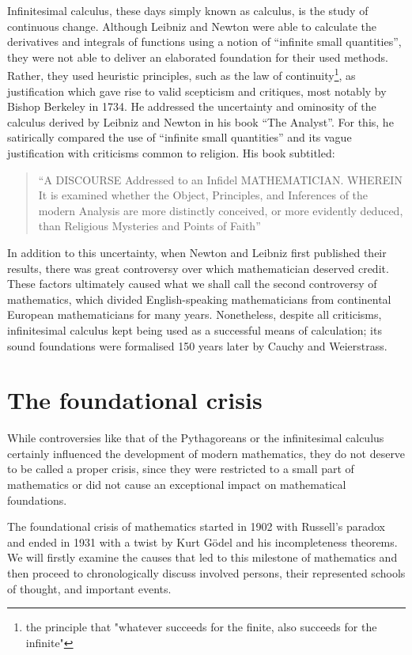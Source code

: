 \documentclass[hidelinks]{article}
\begin{document}
Infinitesimal calculus, these days simply known as calculus, is the study of continuous change. Although Leibniz and Newton were able to calculate the derivatives and integrals of functions using a notion of ``infinite small quantities'', they were not able to deliver an elaborated foundation for their used methods. Rather, they used heuristic principles, such as the law of continuity\footnote{the principle that "whatever succeeds for the finite, also succeeds for the infinite"}, as justification which gave rise to valid scepticism and critiques, most notably by Bishop Berkeley in 1734. He addressed the uncertainty and ominosity of the calculus derived by Leibniz and Newton in his book ``The Analyst''. For this, he satirically compared the use of ``infinite small quantities'' and its vague justification with criticisms common to religion. His book subtitled:
\begin{quote}
	``A DISCOURSE Addressed to an Infidel MATHEMATICIAN\@. WHEREIN It is examined whether the Object, Principles, and Inferences of the modern Analysis are more distinctly conceived, or more evidently deduced, than Religious Mysteries and Points of Faith''
\end{quote}
In addition to this uncertainty, when Newton and Leibniz first published their results, there was great controversy over which mathematician deserved credit. These factors ultimately caused what we shall call the second controversy of mathematics, which divided English-speaking mathematicians from continental European mathematicians for many years. None\-theless, despite all criticisms, infinitesimal calculus kept being used as a successful means of calculation; its sound foundations were formalised 150 years later by Cauchy and Weierstrass.

\section{The foundational crisis}
While controversies like that of the Pythagoreans or the infinitesimal calculus certainly influenced the development of modern mathematics, they do not deserve to be called a proper crisis, since they were restricted to a small part of mathematics or did not cause an exceptional impact on mathematical foundations.

The foundational crisis of mathematics started in 1902 with Russell's paradox and ended in 1931 with a twist by Kurt Gödel and his incompleteness theorems.
We will firstly examine the causes that led to this milestone of mathematics and then proceed to chronologically discuss involved persons, their represented schools of thought, and important events.
\end{document}
